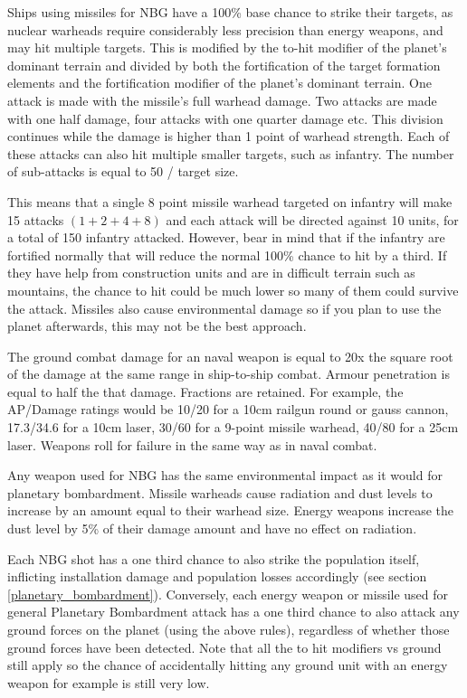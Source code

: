 \documentclass[../../Aurora C# unofficial manual.tex]{subfiles}
\begin{document}
	Ships using missiles for NBG have a 100\% base chance to strike their targets, as nuclear warheads require considerably less precision than energy weapons, and may hit multiple targets. This is modified by the to-hit modifier of the planet's dominant terrain and divided by both the fortification of the target formation elements and the fortification modifier of the planet's dominant terrain. One attack is made with the missile's full warhead damage. Two attacks are made with one half damage, four attacks with one quarter damage etc. This division continues while the damage is higher than 1 point of warhead strength. Each of these attacks can also hit multiple smaller targets, such as infantry. The number of sub-attacks is equal to 50 / target size.
	
	This means that a single 8 point missile warhead targeted on infantry will make 15 attacks \( (1 + 2 + 4 + 8) \) and each attack will be directed against 10 units, for a total of 150 infantry attacked. However, bear in mind that if the infantry are fortified normally that will reduce the normal 100\% chance to hit by a third. If they have help from construction units and are in difficult terrain such as mountains, the chance to hit could be much lower so many of them could survive the attack. Missiles also cause environmental damage so if you plan to use the planet afterwards, this may not be the best approach.
	
	The ground combat damage for an naval weapon is equal to 20x the square root of the damage at the same range in ship-to-ship combat. Armour penetration is equal to half the that damage. Fractions are retained. For example, the AP/Damage ratings would be 10/20 for a 10cm railgun round or gauss cannon, 17.3/34.6 for a 10cm laser, 30/60 for a 9-point missile warhead, 40/80 for a 25cm laser. Weapons roll for failure in the same way as in naval combat.
	
	Any weapon used for NBG has the same environmental impact as it would for planetary bombardment. Missile warheads cause radiation and dust levels to increase by an amount equal to their warhead size. Energy weapons increase the dust level by 5\% of their damage amount and have no effect on radiation.
	
	Each NBG shot has a one third chance to also strike the population itself, inflicting installation damage and population losses accordingly (see section \ref{planetary_bombardment}). Conversely, each energy weapon or missile used for general Planetary Bombardment attack has a one third chance to also attack any ground forces on the planet (using the above rules), regardless of whether those ground forces have been detected. Note that all the to hit modifiers vs ground still apply so the chance of accidentally hitting any ground unit with an energy weapon for example is still very low.
\end{document}
